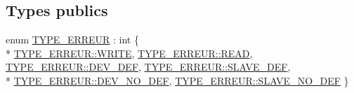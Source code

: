 \subsection*{Types publics}
\begin{DoxyCompactItemize}
\item 
enum \hyperlink{class_c_i2_c_1_1_erreur_a153281c8e751b72b355d52c548b511d5}{T\+Y\+P\+E\+\_\+\+E\+R\+R\+E\+U\+R} \+: int \{ \\*
\hyperlink{class_c_i2_c_1_1_erreur_a153281c8e751b72b355d52c548b511d5ad4b9e47f65b6e79b010582f15785867e}{T\+Y\+P\+E\+\_\+\+E\+R\+R\+E\+U\+R\+::\+W\+R\+I\+T\+E}, 
\hyperlink{class_c_i2_c_1_1_erreur_a153281c8e751b72b355d52c548b511d5a3466fab4975481651940ed328aa990e4}{T\+Y\+P\+E\+\_\+\+E\+R\+R\+E\+U\+R\+::\+R\+E\+A\+D}, 
\hyperlink{class_c_i2_c_1_1_erreur_a153281c8e751b72b355d52c548b511d5ae1f10060c3313d98dd2413dee71e18e2}{T\+Y\+P\+E\+\_\+\+E\+R\+R\+E\+U\+R\+::\+D\+E\+V\+\_\+\+D\+E\+F}, 
\hyperlink{class_c_i2_c_1_1_erreur_a153281c8e751b72b355d52c548b511d5ad9c45b0127babe676fc8586726b05874}{T\+Y\+P\+E\+\_\+\+E\+R\+R\+E\+U\+R\+::\+S\+L\+A\+V\+E\+\_\+\+D\+E\+F}, 
\\*
\hyperlink{class_c_i2_c_1_1_erreur_a153281c8e751b72b355d52c548b511d5ab25df6fa3e61307affa2644bd2251f0b}{T\+Y\+P\+E\+\_\+\+E\+R\+R\+E\+U\+R\+::\+D\+E\+V\+\_\+\+N\+O\+\_\+\+D\+E\+F}, 
\hyperlink{class_c_i2_c_1_1_erreur_a153281c8e751b72b355d52c548b511d5ac43160b89b55550045fa76263b24e616}{T\+Y\+P\+E\+\_\+\+E\+R\+R\+E\+U\+R\+::\+S\+L\+A\+V\+E\+\_\+\+N\+O\+\_\+\+D\+E\+F}
 \}
\end{DoxyCompactItemize}
